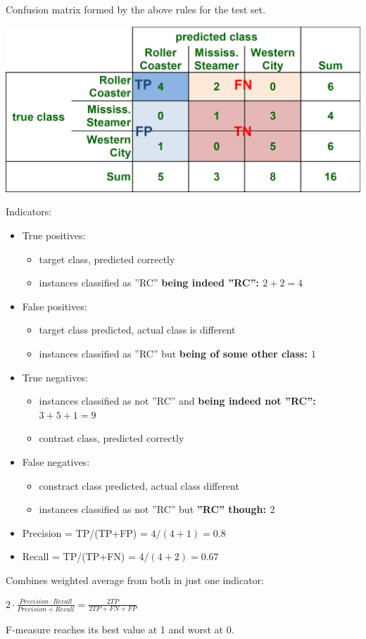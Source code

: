 \begin{breakbox}
Confusion matrix formed by the above rules for the test set.
\begin{center}
	\includegraphics[width=.15\textwidth]{slides_images/confusion_matrix_theme_park}
\end{center}

Indicators:

\begin{itemize}
	\item True positives:
	\begin{itemize}
		\item target class, predicted correctly
		\item instances classified as ''RC'' \textbf{being indeed ''RC'': $2+2=4$}
	\end{itemize}
	\item False positives:
		\begin{itemize}
			\item target class predicted, actual class is different
			\item instances classified as ''RC'' but \textbf{being of some other class: $1$}		
		\end{itemize}
	\item True negatives:
		\begin{itemize}
			\item instances classified as not ''RC'' and \textbf{being indeed not ''RC'': $3 + 5 + 1 = 9$}
			\item contrast class, predicted correctly
		\end{itemize}
	\item False negatives: 
		\begin{itemize}
			\item constract class predicted, actual class different
			\item instances classified as not ''RC'' but \textbf{''RC'' though: $2$}
		\end{itemize}
	\item Precision = TP/(TP+FP) = $4/(4+1)=0.8$
	\item Recall = TP/(TP+FN) = $4/(4+2)=0.67$
\end{itemize}
\end{breakbox}



\begin{breakbox}

Combines weighted average from both in just one indicator:

\begin{center}
$2 \cdot \frac{Precision \cdot Recall}{Precision + Recall} = \frac{2TP}{2TP + FN + FP} $ 
\end{center}

F-measure reaches its best value at 1 and worst at 0.
\end{breakbox}



